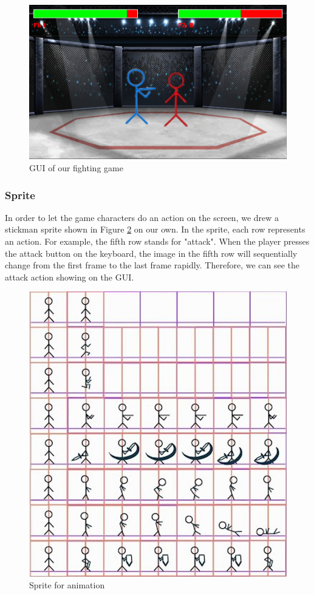 \begin{figure}[ht]
    \centering
    \includegraphics[scale=.1]{fig/game_gui.jpg}
    \caption{GUI of our fighting game}
    \label{fig:gui}
\end{figure}
\subsubsection{Sprite}

In order to let the game characters do an action on the screen, we drew a stickman sprite shown in Figure \ref{fig:sprite} on our own. In the sprite, each row represents an action. For example, the fifth row stands for "attack". When the player presses the attack button on the keyboard, the image in the fifth row will sequentially change from the first frame to the last frame rapidly. Therefore, we can see the attack action showing on the GUI.

\begin{figure}[ht]
    \centering
    \includegraphics[scale=.35]{fig/sprite.jpg}
    \caption{Sprite for animation}
    \label{fig:sprite}
\end{figure}


